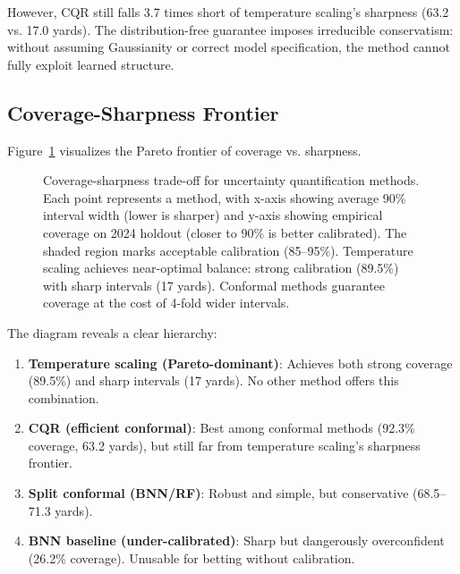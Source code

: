 However, CQR still falls 3.7 times short of temperature scaling's sharpness (63.2 vs. 17.0 yards). The distribution-free guarantee imposes irreducible conservatism: without assuming Gaussianity or correct model specification, the method cannot fully exploit learned structure.

\subsection{Coverage-Sharpness Frontier}\label{subsec:coverage-sharpness-frontier}

Figure~\ref{fig:conformal-sharpness-tradeoff} visualizes the Pareto frontier of coverage vs. sharpness.

\begin{figure}[t]
    \centering
    
    \caption{Coverage-sharpness trade-off for uncertainty quantification methods. Each point represents a method, with x-axis showing average 90\% interval width (lower is sharper) and y-axis showing empirical coverage on 2024 holdout (closer to 90\% is better calibrated). The shaded region marks acceptable calibration (85--95\%). Temperature scaling achieves near-optimal balance: strong calibration (89.5\%) with sharp intervals (17 yards). Conformal methods guarantee coverage at the cost of 4-fold wider intervals.}
    \label{fig:conformal-sharpness-tradeoff}
\end{figure}

The diagram reveals a clear hierarchy:

\begin{enumerate}
    \item \textbf{Temperature scaling (Pareto-dominant)}: Achieves both strong coverage (89.5\%) and sharp intervals (17 yards). No other method offers this combination.

    \item \textbf{CQR (efficient conformal)}: Best among conformal methods (92.3\% coverage, 63.2 yards), but still far from temperature scaling's sharpness frontier.

    \item \textbf{Split conformal (BNN/RF)}: Robust and simple, but conservative (68.5--71.3 yards).

    \item \textbf{BNN baseline (under-calibrated)}: Sharp but dangerously overconfident (26.2\% coverage). Unusable for betting without calibration.
\end{enumerate}


